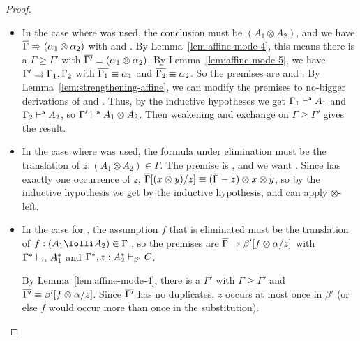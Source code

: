 \begin{proof}
\begin{itemize}
\item In the case where \FR\/ was used, the conclusion must be $(A_1
  \otimes A_2)$, and we have $\overline{\Gamma} \Rightarrow (\alpha_1 \otimes
  \alpha_2)$ with  and
  .  By Lemma~\ref{lem:affine-mode-4},
  this means there is a $\Gamma \ge \Gamma'$ with $\overline{\Gamma'} \equiv
  (\alpha_1 \otimes \alpha_2)$.  By Lemma~\ref{lem:affine-mode-5}, we
  have $\Gamma' \rightrightarrows \Gamma_1,\Gamma_2$ with $\overline{\Gamma_1} \equiv
  \alpha_1$ and $\overline{\Gamma_2} \equiv \alpha_2$. So the premises are
   and
  .  By
  Lemma~\ref{lem:strengthening-affine}, we can modify the premises to
  no-bigger derivations of  and
  .  Thus, by the inductive
  hypotheses we get $\Gamma_1 \vdash^{\mathsf{a}} A_1$ and $\Gamma_2 \vdash^{\mathsf{a}} A_2$,
  so $\Gamma' \vdash^{\mathsf{a}} A_1 \otimes A_2$.  Then weakening and exchange on
  $\Gamma \ge \Gamma'$ gives the result.

\item 
  In the case where \FL\/ was used, the formula under elimination must
  be the translation of $z:(A_1 \otimes A_2) \in \Gamma$. The premise is
  ,
  and we want .  Since \vars{\Gamma} has exactly one
  occurrence of $z$, $\overline{\Gamma}[(x \otimes y)/z] \equiv
  (\overline{\Gamma}-z)\otimes x \otimes y$, so by the inductive hypothesis
  we get  by the inductive hypothesis, and
  can apply $\otimes$-left.

\item In the case for \UL, the assumption $f$ that is eliminated must be
  the translation of $f:(A_1 \lolli A_2) \in \Gamma$ , so the premises
  are $\overline{\Gamma} \Rightarrow \beta'[f \otimes \alpha/z]$ with
  $\Gamma^* \vdash_{\alpha} A_1^*$ and
  $\Gamma^*,z:A_2^* \vdash_{\beta'} C$. 

  By Lemma~\ref{lem:affine-mode-4}, there is a $\Gamma'$ with $\Gamma
  \ge \Gamma'$ and $\overline{\Gamma'} \equiv \beta'[f \otimes \alpha/z]$.
  Since $\overline{\Gamma'}$ has no duplicates, $z$ occurs at most once in
  $\beta'$ (or else $f$ would occur more than once in the substitution).
  

\end{itemize}
\end{proof}
